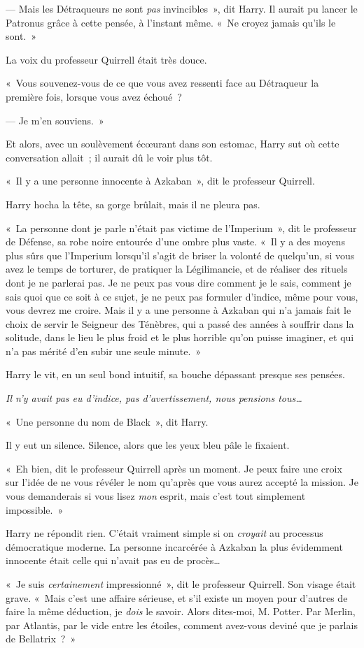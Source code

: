 --- Mais les Détraqueurs ne sont \emph{pas} invincibles~», dit Harry.
Il aurait pu lancer le Patronus grâce à cette pensée, à l'instant même.
«~Ne croyez jamais qu'ils le sont.~»

La voix du professeur Quirrell était très douce.

«~Vous souvenez-vous de ce que vous avez ressenti face au Détraqueur la première fois, lorsque vous avez échoué~?

--- Je m'en souviens.~»

Et alors, avec un soulèvement écœurant dans son estomac, Harry sut où cette conversation allait~; il aurait dû le voir plus tôt.

«~Il y a une personne innocente à Azkaban~», dit le professeur Quirrell.

Harry hocha la tête, sa gorge brûlait, mais il ne pleura pas.

«~La personne dont je parle n'était pas victime de l'Imperium~», dit le professeur de Défense, sa robe noire entourée d'une ombre plus vaste.
«~Il y a des moyens plus sûrs que l'Imperium lorsqu'il s'agit de briser la volonté de quelqu'un, si vous avez le temps de torturer, de pratiquer la Légilimancie, et de réaliser des rituels dont je ne parlerai pas.
Je ne peux pas vous dire comment je le sais, comment je sais quoi que ce soit à ce sujet, je ne peux pas formuler d'indice, même pour vous, vous devrez me croire.
Mais il y a une personne à Azkaban qui n'a jamais fait le choix de servir le Seigneur des Ténèbres, qui a passé des années à souffrir dans la solitude, dans le lieu le plus froid et le plus horrible qu'on puisse imaginer, et qui n'a pas mérité d'en subir une seule minute.~»

Harry le vit, en un seul bond intuitif, sa bouche dépassant presque ses pensées.

\emph{Il n'y avait pas eu d'indice, pas d'avertissement, nous pensions tous…}

«~Une personne du nom de Black~», dit Harry.

Il y eut un silence.
Silence, alors que les yeux bleu pâle le fixaient.

«~Eh bien, dit le professeur Quirrell après un moment.
Je peux faire une croix sur l'idée de ne vous révéler le nom qu'après que vous aurez accepté la mission.
Je vous demanderais si vous lisez \emph{mon} esprit, mais c'est tout simplement impossible.~»

Harry ne répondit rien.
C'était vraiment simple si on \emph{croyait} au processus démocratique moderne.
La personne incarcérée à Azkaban la plus évidemment innocente était celle qui n'avait pas eu de procès…

«~Je suis \emph{certainement} impressionné~», dit le professeur Quirrell.
Son visage était grave.
«~Mais c'est une affaire sérieuse, et s'il existe un moyen pour d'autres de faire la même déduction, je \emph{dois} le savoir.
Alors dites-moi, M. Potter.
Par Merlin, par Atlantis, par le vide entre les étoiles, comment avez-vous deviné que je parlais de Bellatrix~?~»
